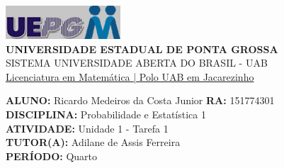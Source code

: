 \documentclass[a4paper, 12pt]{article}
\begin{document}
\begin{flushleft}\includegraphics{logo}\\
\textbf{UNIVERSIDADE ESTADUAL DE PONTA GROSSA} \\
SISTEMA UNIVERSIDADE ABERTA DO BRASIL - UAB \\
\underline{Licenciatura em Matemática | Polo UAB em Jacarezinho}\end{flushleft} 
\textbf{ALUNO:} Ricardo Medeiros da Costa Junior   \textbf{RA:} 151774301 \\
\textbf{DISCIPLINA:} Probabilidade e Estatística 1 \\
\textbf{ATIVIDADE:} Unidade 1 - Tarefa 1 \\ 
\textbf{TUTOR(A):} Adilane de Assis Ferreira \\
\textbf{PERÍODO:} Quarto \\\\
\end{document}
